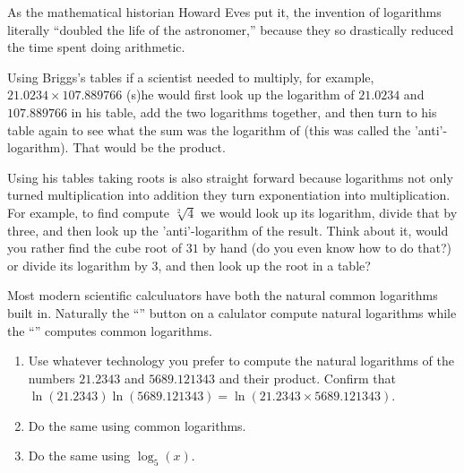 As the mathematical historian Howard Eves put it, the invention of
logarithms literally ``doubled the life of the astronomer,'' because
they so drastically reduced the time spent doing arithmetic.

Using Briggs's tables if a scientist  needed to
multiply, for example, $21.0234\times107.889766$ (s)he would first look up the
logarithm of $21.0234$ and $107.889766$ in his table, add the two
logarithms together, and then turn to his table again to see what the
sum was the logarithm of (this was called the 'anti'-logarithm). That
would be the product. 

Using his tables taking roots is also straight forward because
logarithms not only turned multiplication into addition they turn
exponentiation into multiplication. For example, to find compute
$\sqrt[2]{4}$ we would look up its logarithm, divide that by
three, and then look up the 'anti'-logarithm of the result.  Think
about it, would you rather find the cube root of $31$ by hand (do you
even know how to do that?) or divide its logarithm by $3$, and then
look up the root in a table?

Most modern scientific calculuators have both the natural common
logarithms built in. Naturally the ``'' button on a calulator
compute natural logarithms while the ``'' computes common
logarithms.
\begin{ProficiencyDrill}
  \begin{enumerate}[label={\bf{}(\alph*)}]
  \item Use whatever technology you prefer to compute the natural
    logarithms of the numbers $21.2343$ and $5689.121343$ and their
    product. Confirm that
    $\ln(21.2343) \ln(5689.121343) =
    \ln(21.2343\times5689.121343)$. 
  \item Do the same using common logarithms.
  \item Do the same using $\log_5(x)$. 
  \end{enumerate}
\end{ProficiencyDrill}


